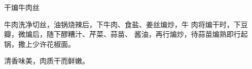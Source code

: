 \begin{recipe}{干煸牛肉丝}

\ingredients


\cooking

牛肉洗净切丝，油锅烧辣后，下牛肉、食盐、姜丝煸炒，牛
肉将煸干时，下豆瓣，微煸后，随下醪糟汁、芹菜、蒜苗、
酱油，再行煸炒，待蒜苗煸熟即行起锅，撒上少许花椒面。

\notes

清香味美，肉质干而鲜嫩。

\end{recipe}

